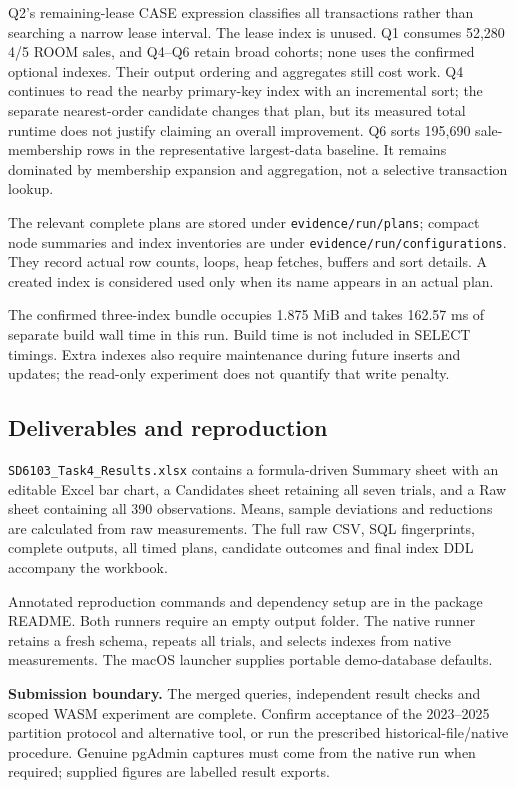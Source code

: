 Q2's remaining-lease CASE expression classifies all transactions rather than searching a narrow lease interval. The lease index is unused. Q1 consumes 52,280 4/5 ROOM sales, and Q4--Q6 retain broad cohorts; none uses the confirmed optional indexes. Their output ordering and aggregates still cost work. Q4 continues to read the nearby primary-key index with an incremental sort; the separate nearest-order candidate changes that plan, but its measured total runtime does not justify claiming an overall improvement. Q6 sorts 195,690 sale-membership rows in the representative largest-data baseline. It remains dominated by membership expansion and aggregation, not a selective transaction lookup.

The relevant complete plans are stored under \texttt{evidence/run/plans}; compact node summaries and index inventories are under \texttt{evidence/run/configurations}. They record actual row counts, loops, heap fetches, buffers and sort details. A created index is considered used only when its name appears in an actual plan.

The confirmed three-index bundle occupies 1.875 MiB and takes 162.57 ms of separate build wall time in this run. Build time is not included in SELECT timings. Extra indexes also require maintenance during future inserts and updates; the read-only experiment does not quantify that write penalty.

\subsection{Deliverables and reproduction}
\texttt{SD6103\_Task4\_Results.xlsx} contains a formula-driven Summary sheet with an editable Excel bar chart, a Candidates sheet retaining all seven trials, and a Raw sheet containing all 390 observations. Means, sample deviations and reductions are calculated from raw measurements. The full raw CSV, SQL fingerprints, complete outputs, all timed plans, candidate outcomes and final index DDL accompany the workbook.

Annotated reproduction commands and dependency setup are in the package README. Both runners require an empty output folder. The native runner retains a fresh schema, repeats all trials, and selects indexes from native measurements. The macOS launcher supplies portable demo-database defaults.

\textbf{Submission boundary.} The merged queries, independent result checks and scoped WASM experiment are complete. Confirm acceptance of the 2023--2025 partition protocol and alternative tool, or run the prescribed historical-file/native procedure. Genuine pgAdmin captures must come from the native run when required; supplied figures are labelled result exports.

